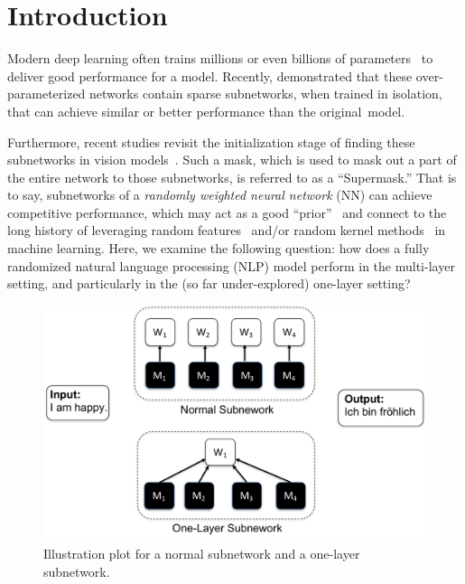 \section{Introduction}
\label{sec:intro}
\vspace{-1mm}

Modern deep learning often trains millions or even billions of parameters~\citep{Devlin:2018bert,shoeybi2019megatron,raffel2019exploring,brown2020language} to deliver good performance for a model. 
Recently, \citet{frankle2018lottery,frankle2020linear} demonstrated that these over-parameterized  networks contain sparse subnetworks, when trained in isolation, that can achieve similar or better performance than the original~model.

Furthermore, recent studies revisit the initialization stage of finding these subnetworks in vision models~\citep{Zhou:2019deconstructing,Ramanujan:2020hidden}.
Such a mask, which is used to mask out a part of the entire network to those subnetworks, is referred to as a ``Supermask.'' 
That is to say, subnetworks of a \textit{randomly weighted neural network} (NN) can achieve competitive performance, which may act as a good  ``prior''~\citep{gaier2019weight} and connect to the long history of leveraging random features~\citep{Gamba:1961papa,Baum:1988jc} and/or random kernel methods~\citep{Rahimi:2008random,Rahimi:2009kitchen} in machine learning. 
Here, we examine the following question: how does a fully randomized natural language processing (NLP) model perform in the multi-layer setting, and particularly in the (so far under-explored) one-layer setting?

\begin{figure}
    \centering
    \includegraphics[width=0.8\linewidth]{fig/sketch.pdf}
            \vspace{-5pt}
    \caption{ Illustration plot for a normal subnetwork and a one-layer subnetwork.}
    \label{fig:model_illustration}
    \vspace{-6mm}
\end{figure}


